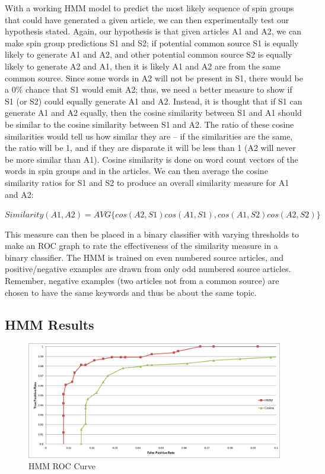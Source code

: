 \documentclass[11pt,letterpaper,oneside, titlepage]{scrartcl}
\begin{document}
With a working HMM model to predict the most likely sequence of spin groups that could have generated a given article, we can then experimentally test our hypothesis stated. Again, our hypothesis is that given articles A1 and A2, we can make spin group predictions S1 and S2; if potential common source S1 is equally likely to generate A1 and A2, and other potential common source S2 is equally likely to generate A2 and A1, then it is likely A1 and A2 are from the same common source. Since some words in A2 will not be present in S1, there would be a 0\% chance that S1 would emit A2; thus, we need a better measure to show if S1 (or S2) could equally generate A1 and A2. Instead, it is thought that if S1 can generate A1 and A2 equally, then the cosine similarity between S1 and A1 should be similar to the cosine similarity between S1 and A2. The ratio of these cosine similarities would tell us how similar they are -- if the similarities are the same, the ratio will be 1, and if they are disparate it will be less than 1 (A2 will never be more similar than A1). Cosine similarity is done on word count vectors of the words in spin groups and in the articles. We can then average the cosine similarity ratios for S1 and S2 to produce an overall similarity measure for A1 and A2:

$Similarity(A1, A2) = AVG\{ cos(A2, S1)cos(A1, S1) , cos(A1, S2)cos(A2, S2) \}$

This measure can then be placed in a binary classifier with varying thresholds to make an ROC graph to rate the effectiveness of the similarity measure in a binary classifier. The HMM is trained on even numbered source articles, and positive/negative examples are drawn from only odd numbered source articles. Remember, negative examples (two articles not from a common source) are chosen to have the same keywords and thus be about the same topic.

\subsection{HMM Results}

\begin{figure}[h!]
  \centering
  \includegraphics[width=1\textwidth]{hmm_ROC}
  \caption{HMM ROC Curve}
  \label{fig:hmm_ROC}
\end{figure}
\end{document}
